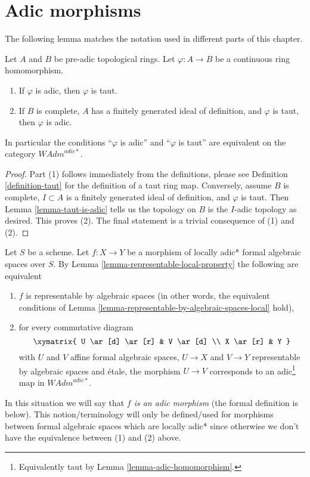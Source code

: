 \section{Adic morphisms}
\label{section-adic}

\noindent
The following lemma matches the notation used in different parts
of this chapter.

\begin{lemma}
\label{lemma-adic-homomorphism}
Let $A$ and $B$ be pre-adic topological rings. Let
$\varphi : A \to B$ be a continuous ring homomorphism.
\begin{enumerate}
\item If $\varphi$ is adic, then $\varphi$ is taut.
\item If $B$ is complete, $A$ has a finitely generated
ideal of definition, and $\varphi$ is taut, then $\varphi$ is adic.
\end{enumerate}
In particular the conditions ``$\varphi$ is adic'' and ``$\varphi$ is taut''
are equivalent on the category $\textit{WAdm}^{adic*}$.
\end{lemma}

\begin{proof}
Part (1) follows immediately from the definitions, please see
Definition \ref{definition-taut} for the definition of a taut ring map.
Conversely, assume $B$ is complete, $I \subset A$ is a finitely generated
ideal of definition, and $\varphi$ is taut. Then
Lemma \ref{lemma-taut-is-adic} tells us the topology on $B$
is the $I$-adic topology as desired. This proves (2). The final
statement is a trivial consequence of (1) and (2).
\end{proof}

\noindent
Let $S$ be a scheme. Let $f : X \to Y$ be a morphism of
locally adic* formal algebraic spaces over $S$.
By Lemma \ref{lemma-representable-local-property}
the following are equivalent
\begin{enumerate}
\item $f$ is representable by algebraic spaces (in other words, the
equivalent conditions of
Lemma \ref{lemma-representable-by-algebraic-spaces-local} hold),
\item for every commutative diagram
$$
\xymatrix{
U \ar[d] \ar[r] & V \ar[d] \\
X \ar[r] & Y
}
$$
with $U$ and $V$ affine formal algebraic spaces, $U \to X$ and $V \to Y$
representable by algebraic spaces and \'etale, the morphism $U \to V$
corresponds to an adic\footnote{Equivalently taut by
Lemma \ref{lemma-adic-homomorphism}.} map in $\textit{WAdm}^{adic*}$.
\end{enumerate}
In this situation we will say that {\it $f$ is an adic morphism} (the formal
definition is below). This notion/terminology will only be defined/used
for morphisms between formal algebraic spaces which are locally adic*
since otherwise we don't have the equivalence between (1) and (2) above.

